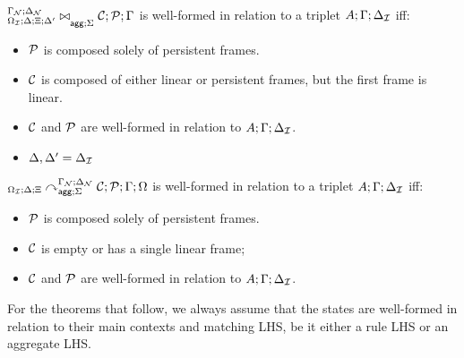 \begin{definition}

${{}^{\Gamma_{\mathcal{N}} ; \Delta_{\mathcal{N}}}_{\Omega_{\mathcal{I}} ; \Delta; \Xi; \Delta'}\bowtie}_{\mathsf{agg} ; \Sigma} \; \mathcal{C}; \mathcal{P} ; \Gamma$ is
well-formed in relation to a triplet $A; \Gamma; \Delta_{\mathcal{I}}$ iff:

\begin{itemize}[leftmargin=*]

   \item $\mathcal{P}$ is composed solely of persistent frames.

   \item $\mathcal{C}$ is composed of either linear or persistent frames, but the
      first frame is linear.

   \item $\mathcal{C}$ and $\mathcal{P}$ are well-formed in relation to $A;
      \Gamma; \Delta_{\mathcal{I}}$.

   \item $\Delta, \Delta' = \Delta_{\mathcal{I}}$

\end{itemize}
\end{definition}

\begin{definition}

${{}_{\Omega_{\mathcal{I}} ; \Delta ; \Xi}\curvearrowright}_{\mathsf{agg} ; \Sigma}^{\Gamma_{\mathcal{N}}; \Delta_{\mathcal{N}}} \; \mathcal{C};
\mathcal{P} ; \Gamma ; \Omega$ is well-formed in relation to a triplet $A; \Gamma;
\Delta_{\mathcal{I}}$ iff:

\begin{itemize}[leftmargin=*]

   \item $\mathcal{P}$ is composed solely of persistent frames.

   \item $\mathcal{C}$ is empty or has a single linear frame;

   \item $\mathcal{C}$ and $\mathcal{P}$ are well-formed in relation to $A;
      \Gamma; \Delta_{\mathcal{I}}$.

\end{itemize}

\end{definition}

For the theorems that follow, we always assume that the states are well-formed
in relation to their main contexts and matching LHS, be it either a rule LHS or
an aggregate LHS.
